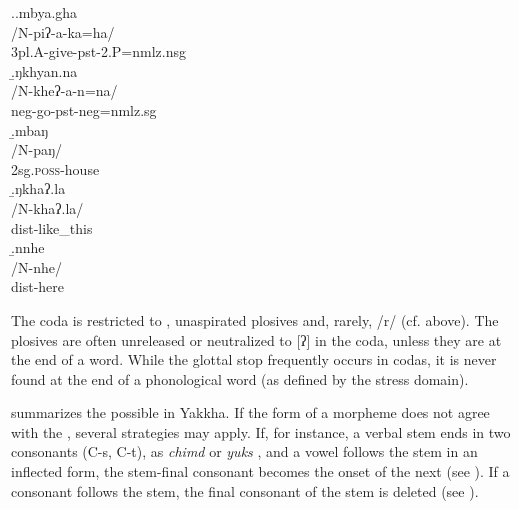 \ex.\a.\glll	mbya.gha\\
			/N-piʔ-a-ka=ha/\\
			{\sc 3pl.A-}give{\sc -pst-2.P=nmlz.nsg}\\
			\b.\glll ŋkhyan.na\\
			/N-kheʔ-a-n=na/\\
			{\sc neg-}go{\sc [3sg]-pst-neg=nmlz.sg}\\
			\b.\glll	mbaŋ\\
			/N-paŋ/\\
			{\sc 2sg.\textsc{poss}-}house\\
			\b.\glll ŋkhaʔ.la\\
			/N-khaʔ.la/\\
			{\sc dist-}like\_this\\
			\b.\glll  nnhe\\
			/N-nhe/\\
			{\sc dist-}here\\



The coda is restricted to , unaspirated plosives  and, rarely, /r/ (cf.  above). The plosives are often unreleased or neutralized to [ʔ] in the coda, unless they are at the end of a word. While the glottal stop frequently occurs in  codas, it  is never found at the end of a phonological word (as defined by the stress domain).  


 summarizes the possible  in Yakkha. If the form of a morpheme does not agree with the , several strategies may apply. If, for instance, a verbal stem ends in two consonants (C-s, C-t), as \emph{chimd}  or \emph{yuks} , and a vowel follows the stem in an inflected form, the stem-final consonant becomes the onset of the next  (see \Next). If a consonant follows the stem, the final consonant of the stem is deleted (see \NNext). 



